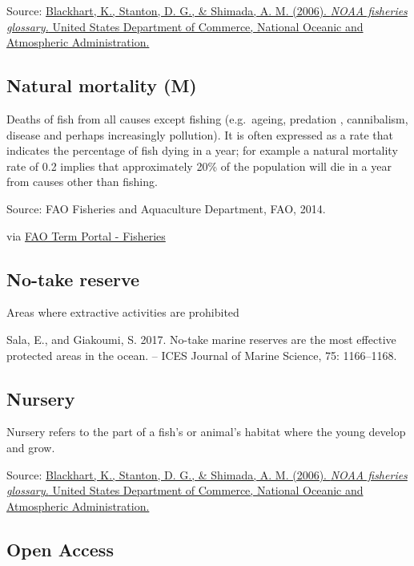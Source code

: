 \documentclass[
  11pt,
]{book}
\begin{document}
Source: \href{https://repository.library.noaa.gov/view/noaa/12856}{Blackhart, K., Stanton, D. G., \& Shimada, A. M. (2006). \emph{NOAA fisheries glossary.} United States Department of Commerce, National Oceanic and Atmospheric Administration.}

\hypertarget{natural-mortality-m}{%
\subsection{Natural mortality (M)}\label{natural-mortality-m}}

Deaths of fish from all causes except fishing (e.g.~ageing, predation , cannibalism, disease and perhaps increasingly pollution). It is often expressed as a rate that indicates the percentage of fish dying in a year; for example a natural mortality rate of 0.2 implies that approximately 20\% of the population will die in a year from causes other than fishing.

Source: FAO Fisheries and Aquaculture Department, FAO, 2014.

via \href{http://www.fao.org/fishery/glossary/en}{FAO Term Portal - Fisheries}

\hypertarget{no-take-reserve}{%
\subsection{No-take reserve}\label{no-take-reserve}}

Areas where extractive activities are prohibited

Sala, E., and Giakoumi, S. 2017. No-take marine reserves are the most effective protected areas in the ocean. -- ICES Journal of Marine Science, 75: 1166--1168.

\hypertarget{nursery}{%
\subsection{Nursery}\label{nursery}}

Nursery refers to the part of a fish's or animal's habitat where the young develop and grow.

Source: \href{https://repository.library.noaa.gov/view/noaa/12856}{Blackhart, K., Stanton, D. G., \& Shimada, A. M. (2006). \emph{NOAA fisheries glossary.} United States Department of Commerce, National Oceanic and Atmospheric Administration.}

\hypertarget{open-access}{%
\subsection{Open Access}\label{open-access}}
\end{document}

